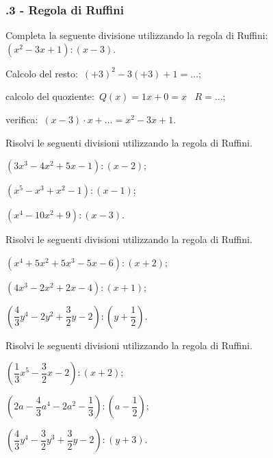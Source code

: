 \subsubsection*{\thechapter.3 - Regola di Ruffini}

\begin{esercizio}
\label{ese:12.8}
Completa la seguente divisione utilizzando la regola di Ruffini:\:$\left(x^{2}-3x+1\right):(x-3)$.
\begin{itemize*}
\item Calcolo del resto:~$(+3)^{2}-3(+3)+1=\ldots$;
\item calcolo del quoziente:~$Q(x)=1x+0=x$ \quad~$R=\ldots$;
\item verifica:~$(x-3)\cdot x+\ldots =x^{2}-3x+1$.
\end{itemize*}
\end{esercizio}

\begin{esercizio}[\Ast]
\label{ese:12.9}
Risolvi le seguenti divisioni utilizzando la regola di Ruffini.
 \begin{enumeratea}
 \item $\left(3x^{3}-4x^{2}+5x-1\right):(x-2)$;%
 \item $\left(x^{5}-x^{3}+x^{2}-1\right):(x-1)$;%
 \item $\left(x^{4}-10x^{2}+9\right):(x-3)$.%
 \end{enumeratea}
\end{esercizio}

\begin{esercizio}[\Ast]
\label{ese:12.10}
Risolvi le seguenti divisioni utilizzando la regola di Ruffini.
 \begin{enumeratea}
 \item $\left(x^{4}+5x^{2}+5x^{3}-5x-6 \right):(x+2)$;%
 \item $\left(4x^{3}-2x^{2}+2x-4 \right):(x+1)$;%
 \item $\left(\dfrac{4}{3}y^{4}-2y^{2}+\dfrac{3}{2}y-2\right):\left(y+\dfrac{1}{2}\right)$.%
 \end{enumeratea}
\end{esercizio}

\begin{esercizio}[\Ast]
\label{ese:12.11}
Risolvi le seguenti divisioni utilizzando la regola di Ruffini.
 \begin{enumeratea}
 \item $\left(\dfrac{1}{3}x^{5}-\dfrac{3}{2}x-2\right):(x+2)$;
 \item $\left(2a-\dfrac{4}{3}a^{4}-2a^{2}-\dfrac{1}{3}\right):\left(a-\dfrac{1}{2}\right)$;
 \item $\left(\dfrac{4}{3}y^{4}-\dfrac{3}{2}y^{3}+\dfrac{3}{2}y-2\right):\left(y+3\right)$.
 \end{enumeratea}
\end{esercizio}


